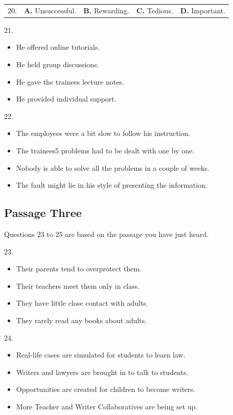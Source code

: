 \documentclass[UTF8,11pt]{ctexart}
\begin{document}
\noindent\begin{tabularx}{\linewidth}{@{}lXXXX@{}}20. & \textbf{A.} Unsuccessful. & \textbf{B.} Rewarding. & \textbf{C.} Tedious. & \textbf{D.} Important.\\\end{tabularx}\par

21.


\begin{itemize}[leftmargin=2em,itemsep=.2em,topsep=.4em]\item[A.] He offered online tutorials.
\item[B.] He held group discussions.
\item[C.] He gave the trainees lecture notes.
\item[D.] He provided individual support.
\end{itemize}

22.


\begin{itemize}[leftmargin=2em,itemsep=.2em,topsep=.4em]\item[A.] The employees were a bit slow to follow his instruction.
\item[B.] The trainees5 problems had to be dealt with one by one.
\item[C.] Nobody is able to solve all the problems in a couple of weeks.
\item[D.] The fault might lie in his style of presenting the information.
\end{itemize}

\subsection*{Passage Three}


Questions 23 to 25 are based on the passage you have just heard.


23.


\begin{itemize}[leftmargin=2em,itemsep=.2em,topsep=.4em]\item[A.] Their parents tend to overprotect them.
\item[B.] Their teachers meet them only in class.
\item[C.] They have little close contact with adults.
\item[D.] They rarely read any books about adults.
\end{itemize}

24.


\begin{itemize}[leftmargin=2em,itemsep=.2em,topsep=.4em]\item[A.] Real-life cases are simulated for students to learn law.
\item[B.] Writers and lawyers are brought in to talk to students.
\item[C.] Opportunities are created for children to become writers.
\item[D.] More Teacher and Writer Collaboratives are being set up.
\end{itemize}
\end{document}
